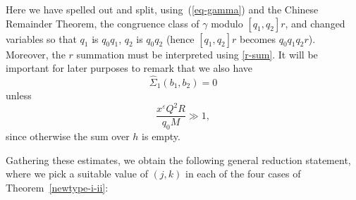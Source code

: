\documentclass[12pt,a4paper,reqno]{amsart}
\numberwithin{equation}{section}
\theoremstyle{plain}
\theoremstyle{definition}
\newcommand\eps{\varepsilon}
\newcommand{\DIone}[2]{\mathcal{D}_{{#1}}({#2})}
\newcommand\sumsum{\mathop{\sum\sum}\limits}
\renewcommand{\sim}{\asymp}
\renewcommand{\lessapprox}{\llcurly}
\begin{document}
Here we have spelled out and split, using~(\ref{eq-gamma}) and the
Chinese Remainder Theorem, the congruence class of $\gamma$ modulo
$[q_1,q_2]r$, and changed variables so that $q_1$ is $q_0q_1$, $q_2$
is $q_0q_2$ (hence $[q_1,q_2]r$ becomes $q_0q_1q_2r$).  Moreover, the
$r$ summation must be interpreted using \eqref{r-sum}. It will be
important for later purposes to remark that we also have
$$
\hat{\Sigma}_1(b_1,b_2)=0
$$
unless
\begin{equation}\label{eq-h-condition}
\frac{ x^\eps Q^2 R}{q_0M}\gg 1,
\end{equation}
since otherwise the sum over $h$ is empty.
\par

Gathering these estimates, we obtain the following general reduction
statement, where we pick a suitable value of $(j,k)$ in each of the
four cases of Theorem~\ref{newtype-i-ii}: 


\end{document}
